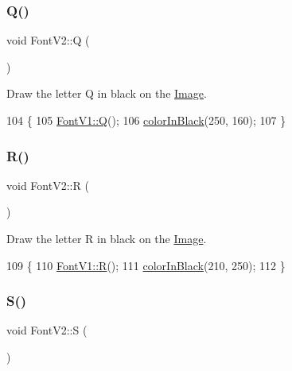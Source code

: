 \subsubsection{\texorpdfstring{Q()}{Q()}}
{\footnotesize\ttfamily void Font\+V2\+::Q (\begin{DoxyParamCaption}{ }\end{DoxyParamCaption})}



Draw the letter Q in black on the \mbox{\hyperlink{class_image}{Image}}. 


\begin{DoxyCode}
104                \{
105     \mbox{\hyperlink{class_font_v1_af7ffd76bf02756d0d1e2d3eab4c65c40}{FontV1::Q}}();
106     \mbox{\hyperlink{class_font_v2_a04f2501961bc286ce70fbb6a840b0e8a}{colorInBlack}}(250, 160);
107 \}
\end{DoxyCode}
\mbox{\label{class_font_v2_a852e482795dc7557137419b713711774}} 
\subsubsection{\texorpdfstring{R()}{R()}}
{\footnotesize\ttfamily void Font\+V2\+::R (\begin{DoxyParamCaption}{ }\end{DoxyParamCaption})}



Draw the letter R in black on the \mbox{\hyperlink{class_image}{Image}}. 


\begin{DoxyCode}
109                \{
110     \mbox{\hyperlink{class_font_v1_ab3f9a7e62f7d08792d9028da68f5787e}{FontV1::R}}();
111     \mbox{\hyperlink{class_font_v2_a04f2501961bc286ce70fbb6a840b0e8a}{colorInBlack}}(210, 250);
112 \}
\end{DoxyCode}
\mbox{\label{class_font_v2_adcccd6f866d51bb27568d8c4c465551f}} 
\subsubsection{\texorpdfstring{S()}{S()}}
{\footnotesize\ttfamily void Font\+V2\+::S (\begin{DoxyParamCaption}{ }\end{DoxyParamCaption})}



